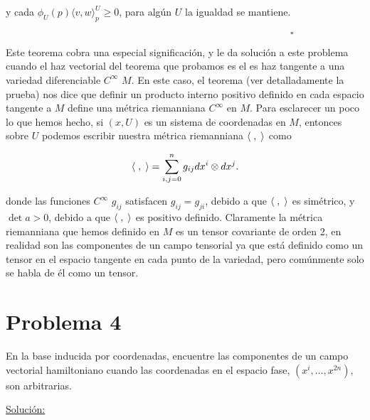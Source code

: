 \documentclass[a4paper,10pt]{article}
\numberwithin{equation}{section}
\begin{document}
y cada $\phi_U(p)\langle v, w \rangle_p^U \geq 0$, para algún $U$ la igualdad 
se mantiene.

$\hspace{12cm} \square$

Este teorema cobra una especial significación, y le da solución a este
problema cuando el haz vectorial del teorema que probamos es el es haz 
tangente a una variedad diferenciable $C^\infty$ $M$. En este caso, 
el teorema (ver detalladamente la prueba) nos dice que definir un producto 
interno positivo definido en cada espacio tangente a $M$ define una 
métrica riemanniana $C^\infty$ en $M$. Para esclarecer un poco lo que hemos hecho,
si $(x,U)$ es un sistema de coordenadas en $M$, entonces sobre $U$ podemos 
escribir nuestra métrica riemanniana $\langle \hspace{.1cm}, \hspace{.1cm} \rangle$ como 

\begin{equation}
 \langle \hspace{.1cm} , \hspace{.1cm} \rangle = \sum_{i,j = 0}^n g_{ij}dx^i \otimes dx^j.
\end{equation}

donde las funciones $C^\infty$ $g_{ij}$ satisfacen $g_{ij} = g_{ji}$, debido 
a que $\langle \hspace{.1cm} , \hspace{.1cm} \rangle$ es simétrico, y $\det{a} > 0$, debido a
que $\langle \hspace{.1cm} , \hspace{.1cm} \rangle$ es positivo definido. Claramente la métrica 
riemanniana que hemos definido en $M$ es un tensor covariante de orden 2, en realidad 
son las componentes de un campo tensorial ya que está definido como un tensor 
en el espacio tangente en cada punto de la variedad, pero comúnmente 
solo se habla de él como un tensor.


\section{Problema 4}

En la base inducida por coordenadas, encuentre las componentes de un campo vectorial 
hamiltoniano cuando las coordenadas en el espacio fase, $(x^i,\dots,x^{2n})$, son 
arbitrarias.

\vspace{.3cm}

\underline{Solución:} \vspace{.3cm}
\end{document}
